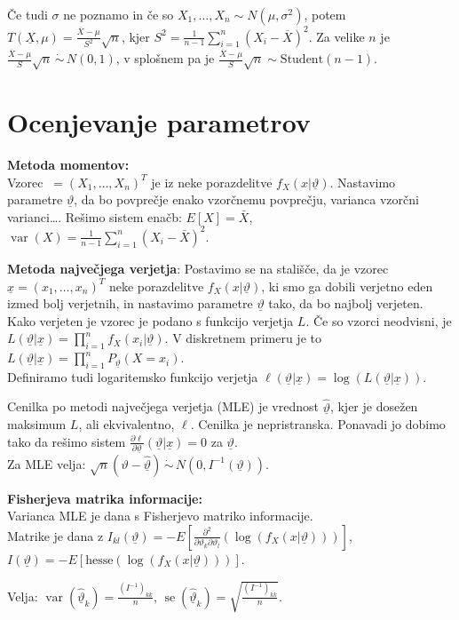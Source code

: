 \documentclass[11pt,a4paper]{amsart}
\theoremstyle{definition} %
\theoremstyle{plain} %
\newcommand{\X}{\underline{X}}
\newcommand{\ux}{\underline{x}}
\newcommand{\utheta}{\underline{\vartheta}}
\DeclareMathOperator{\var}{var}
\DeclareMathOperator{\se}{se}
\begin{document}
Če tudi $\sigma$ ne poznamo in če so $X_1,\ldots, X_n \sim N(\mu, \sigma^2)$,
potem $T(\X ,\mu) = \frac{\overline{X} - \mu}{S^2}\sqrt{n}$, kjer $S^2 =
\frac{1}{n-1} \sum_{i=1}^n (X_i - \overline{X})^2$. Za velike $n$ je $
\frac{\overline{X} - \mu}{S}\sqrt{n} \,\dot{\sim}\, N(0,1)$, v splošnem pa je $
\frac{\overline{X} - \mu}{S}\sqrt{n} \sim \text{Student}(n-1).$


\section*{Ocenjevanje parametrov}
\textbf{Metoda momentov:} \\
Vzorec $\ = (X_1, \dots, X_n)^T$ je iz neke porazdelitve $f_X(x|\utheta)$.
Nastavimo parametre $\utheta$, da bo povprečje enako vzorčnemu povprečju,
varianca vzorčni varianci\dots. Rešimo sistem enačb: $E[X] = \bar{X}$, $\var(X)
= \frac{1}{n-1}\sum_{i=1}^n (X_i - \bar{X})^2$.

\textbf{Metoda največjega verjetja}: Postavimo se na stališče, da je vzorec
$\ux = (x_1, \dots, x_n)^T$ neke porazdelitve
$f_X(x|\utheta)$, ki smo ga dobili verjetno eden izmed bolj verjetnih,
in nastavimo parametre $\utheta$ tako, da bo najbolj verjeten.
Kako verjeten je vzorec je podano s funkcijo verjetja $L$.
Če so vzorci neodvisni, je $L(\utheta|\ux) = \prod_{i=1}^n f_X(x_i|\utheta)$. V
diskretnem primeru je to $L(\utheta|\ux) = \prod_{i=1}^n P_{\utheta}(X=x_i)$. \\
Definiramo tudi logaritemsko funkcijo verjetja $\ell(\utheta|\ux) =
\log(L(\utheta|\ux))$.

Cenilka po metodi največjega verjetja (MLE) je vrednost $\hat{\utheta}$, kjer je
dosežen maksimum $L$, ali ekvivalentno, $\ell$. Cenilka je nepristranska.
Ponavadi jo dobimo tako da rešimo sistem $\frac{\partial \ell}{\partial
\utheta}(\utheta|\ux) = 0$ za $\utheta$. \\
Za MLE velja: $\sqrt{n}(\vartheta - \hat{\utheta}) \,\dot{\sim}\, N(0, I^{-1}(\utheta))$.

\textbf{Fisherjeva matrika informacije:} \\
Varianca MLE je dana s Fisherjevo matriko informacije. \\
Matrike je dana z $I_{kl}(\utheta) = -E\left[\frac{\partial^2}{\partial
\vartheta_k\partial\vartheta_l}(\log(f_X(x|\utheta)))\right]$, $I(\utheta) = -E[\text{hesse}(\log(f_X(x|\utheta)))]$.

Velja: $\var(\hat{\utheta}_k) = \frac{(I^{-1})_{kk}}{n}$, $\se(\hat{\utheta}_k) =
\sqrt{\frac{(I^{-1})_{kk}}{n}}$.
\end{document}
